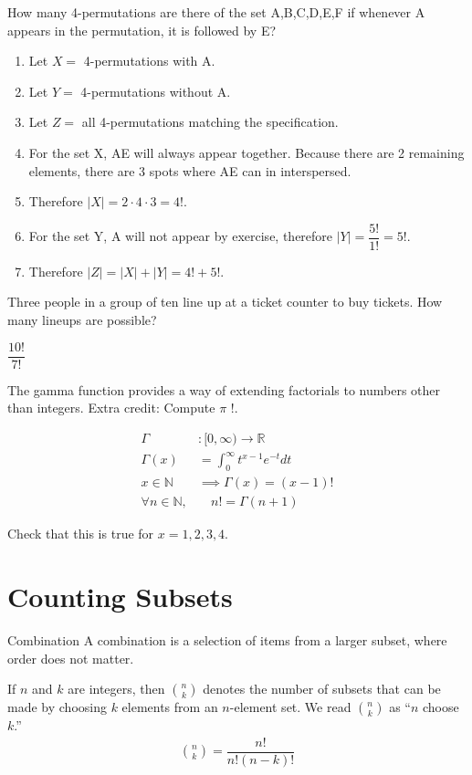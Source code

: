 \documentclass[openany, 12pt]{book}
\begin{document}
\begin{exercise}{}{}
	How many 4-permutations are there of the set A,B,C,D,E,F
	if whenever A appears in the permutation, it is followed by E?
	\begin{enumerate}[label={\textbullet}, leftmargin=*, itemsep=0pt, parsep=0pt]
		\item Let $X=$ 4-permutations with A.
		\item Let $Y=$ 4-permutations without A.
		\item Let $Z=$ all 4-permutations matching the specification.
		\item For the set X, AE will always appear together. Because there are 2
		      remaining elements, there are 3 spots where AE can in interspersed.
		\item Therefore $|X| = 2 \cdot 4\cdot3 = 4!.$
		\item For the set Y, A will not appear by exercise, therefore $|Y| =
			      \dfrac{5!}{1!} = 5!$.
		\item Therefore $|Z| = |X| + |Y| = 4! + 5!$.
	\end{enumerate}
\end{exercise}

\begin{exercise}{}{}
	Three people in a group of ten line up at a ticket counter to buy tickets.
	How many lineups are possible?

	$\dfrac{10!}{7!}$
\end{exercise}

\begin{exercise}{}{}
	The gamma function provides a way of extending factorials to numbers
	other than integers. Extra credit: Compute $\pi$ !.

	\begin{align*}
		\Gamma                    & :[0, \infty) \rightarrow \mathbb{R} \\
		\Gamma(x)                 & =\int_0^{\infty} t^{x-1} e^{-t} d t \\
		x \in \mathbb{N}          & \implies \Gamma(x)=(x-1)!           \\
		\forall n \in \mathbb{N}, & \quad n !=\Gamma(n+1)
	\end{align*}

	Check that this is true for $x=1,2,3,4$.
\end{exercise}

\section{Counting Subsets}
\begin{definition}{Combination}{}
	A combination is a selection of items from a larger subset, where order does
	not matter.

	If $n$ and $k$ are integers, then $\binom{n}{k}$ denotes the number of
	subsets that can be made by choosing $k$ elements from an $n$-element set.
	We read $\binom{n}{k}$ as ``$n$ choose $k$.''
	\begin{align*}
		\binom{n}{k} = \dfrac{n!}{n!(n-k)!}
	\end{align*}
\end{definition}
\end{document}
